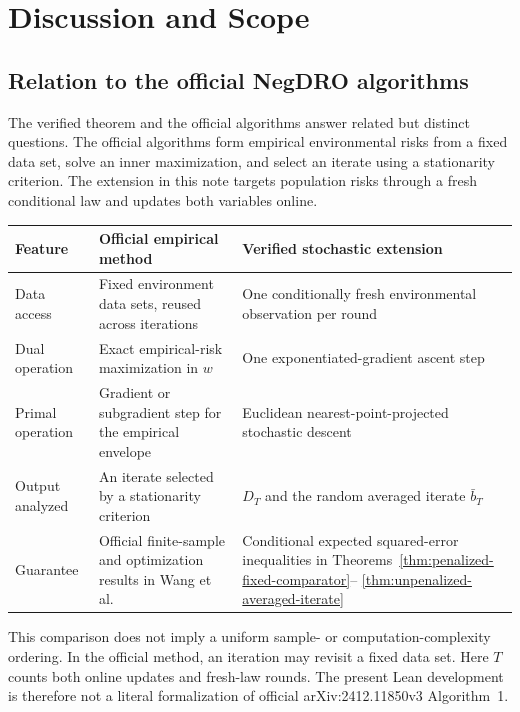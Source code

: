 \section{Discussion and Scope}
\label{sec:discussion}

\subsection{Relation to the official NegDRO algorithms}

The verified theorem and the official algorithms answer related but distinct
questions.  The official algorithms form empirical environmental risks from a
fixed data set, solve an inner maximization, and select an iterate using a
stationarity criterion.  The extension in this note targets population risks
through a fresh conditional law and updates both variables online.

\begin{center}
\small
\begin{tabular}{p{}p{}p{}}
\toprule
Feature & Official empirical method & Verified stochastic extension \\
\midrule
Data access
& Fixed environment data sets, reused across iterations
& One conditionally fresh environmental observation per round \\
Dual operation
& Exact empirical-risk maximization in $w$
& One exponentiated-gradient ascent step \\
Primal operation
& Gradient or subgradient step for the empirical envelope
& Euclidean nearest-point-projected stochastic descent \\
Output analyzed
& An iterate selected by a stationarity criterion
& $D_T$ and the random averaged iterate $\bar b_T$ \\
Guarantee
& Official finite-sample and optimization results in
  Wang et al.~\cite{wang2026negdro}
& Conditional expected squared-error inequalities in
  Theorems~\ref{thm:penalized-fixed-comparator}--
  \ref{thm:unpenalized-averaged-iterate} \\
\bottomrule
\end{tabular}
\end{center}

This comparison does not imply a uniform sample- or computation-complexity
ordering.  In the official method, an iteration may revisit a fixed data set.
Here $T$ counts both online updates and fresh-law rounds.  The present Lean
development is therefore not a literal formalization of official
arXiv:2412.11850v3 Algorithm~1.

